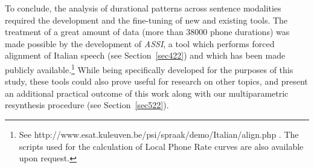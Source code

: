 To conclude, the analysis of durational patterns across sentence modalities required the development and the fine-tuning of new and existing tools. The treatment of a great amount of data (more than 38000 phone durations) was made possible by the development of \textit{ASSI}, a tool which performs forced alignment of Italian speech (see Section~\ref{sec422}) and which has been made publicly available.\footnote{See http://www.esat.kuleuven.be/psi/spraak/demo/Italian/align.php . The scripts used for the calculation of Local Phone Rate curves are also available upon request.} While being specifically developed for the purposes of this study, these tools could also prove useful for research on other topics, and present an additional practical outcome of this work along with our multiparametric resynthesis procedure (see Section~\ref{sec522}).
